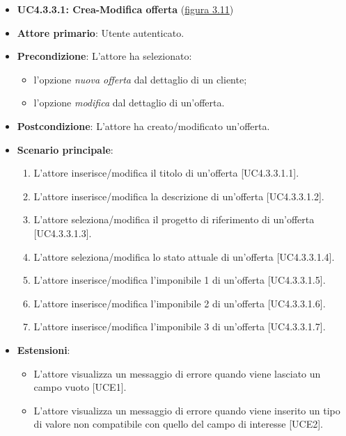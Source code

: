 \begin{itemize}
\item \textbf{UC4.3.3.1: Crea-Modifica offerta} ({\hyperref[fig:UC4.3.3.1]{figura 3.11}})
\item \textbf{Attore primario}: Utente autenticato.
\item \textbf{Precondizione}: L'attore ha selezionato: 
\begin{itemize}
\item l'opzione \textit{nuova offerta} dal dettaglio di un cliente;
\item l'opzione \textit{modifica} dal dettaglio di un'offerta.
\end{itemize}
\item \textbf{Postcondizione}: L'attore ha creato/modificato un'offerta.
\item \textbf{Scenario principale}: 
\begin{enumerate}
\item L'attore inserisce/modifica il titolo di un'offerta [UC4.3.3.1.1].
\item L'attore inserisce/modifica la descrizione di un'offerta [UC4.3.3.1.2].
\item L'attore seleziona/modifica il progetto di riferimento di un'offerta [UC4.3.3.1.3].
\item L'attore seleziona/modifica lo stato attuale di un'offerta [UC4.3.3.1.4].
\item L'attore inserisce/modifica l'imponibile 1 di un'offerta [UC4.3.3.1.5].
\item L'attore inserisce/modifica l'imponibile 2 di un'offerta [UC4.3.3.1.6].
\item L'attore inserisce/modifica l'imponibile 3 di un'offerta [UC4.3.3.1.7].
\end{enumerate}
\item \textbf{Estensioni}: 
\begin{itemize}
\item L'attore visualizza un messaggio di errore quando viene lasciato un campo vuoto [UCE1].
\item L'attore visualizza un messaggio di errore quando viene inserito un tipo di valore non compatibile con quello del campo di interesse [UCE2].
\end{itemize} 
\end{itemize}

\pagebreak

